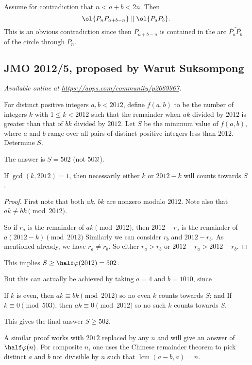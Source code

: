\documentclass[11pt]{scrartcl}
\begin{document}
Assume for contradiction that $n < a+b < 2n$.
Then \[ \ol{P_n P_{a+b-n}} \parallel \ol{P_a P_b}. \]
This is an obvious contradiction
since then $P_{a+b-n}$ is contained in the arc
$\widehat{P_a P_b}$ of the circle through $P_n$.
\pagebreak

\subsection{JMO 2012/5, proposed by Warut Suksompong}
\textsl{Available online at \url{https://aops.com/community/p2669967}.}
\begin{mdframed}[style=mdpurplebox,frametitle={Problem statement}]
For distinct positive integers $a, b<2012$,
define $f(a, b)$ to be the number of integers $k$ with $1\le k<2012$
such that the remainder when $ak$ divided by $2012$ is
greater than that of $bk$ divided by $2012$.
Let $S$ be the minimum value of $f(a, b)$, where $a$ and $b$ range
over all pairs of distinct positive integers less than $2012$.
Determine $S$.
\end{mdframed}
The answer is $S = 502$ (not $503$!).

\begin{claim*}
  If $\gcd(k, 2012) = 1$,
  then necessarily either $k$ or $2012-k$ will counts towards $S$.
\end{claim*}
\begin{proof}
  First note that both $ak$, $bk$ are nonzero modulo $2012$.
  Note also that $ak \not\equiv bk \pmod{2012}$.

  So if $r_a$ is the remainder of $ak \pmod{2012}$,
  then $2012-r_a$ is the remainder of $a(2012-k) \pmod{2012}$
  Similarly we can consider $r_b$ and $2012-r_b$.
  As mentioned already, we have $r_a \neq r_b$.
  So either $r_a > r_b$ or $2012-r_a > 2012-r_b$.
\end{proof}

This implies $S \ge \half \varphi(2012) = 502$.

But this can actually be achieved by taking $a = 4$ and $b = 1010$, since
\begin{itemize}
  \ii If $k$ is even, then $ak \equiv bk \pmod{2012}$
  so no even $k$ counts towards $S$; and
  \ii If $k \equiv 0 \pmod{503}$, then $ak \equiv 0 \pmod{2012}$
  so no such $k$ counts towards $S$.
\end{itemize}
This gives the final answer $S \ge 502$.

\begin{remark*}
  A similar proof works with $2012$ replaced by any $n$
  and will give an answer of $\half\varphi(n)$.
  For composite $n$,
  one uses the Chinese remainder theorem to pick distinct
  $a$ and $b$ not divisible by $n$
  such that $\operatorname{lcm}(a-b, a) = n$.
\end{remark*}
\pagebreak
\end{document}
